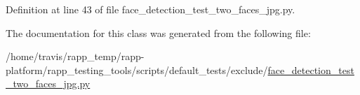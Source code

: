Definition at line 43 of file face\-\_\-detection\-\_\-test\-\_\-two\-\_\-faces\-\_\-jpg.\-py.



The documentation for this class was generated from the following file\-:\begin{DoxyCompactItemize}
\item 
/home/travis/rapp\-\_\-temp/rapp-\/platform/rapp\-\_\-testing\-\_\-tools/scripts/default\-\_\-tests/exclude/\hyperlink{face__detection__test__two__faces__jpg_8py}{face\-\_\-detection\-\_\-test\-\_\-two\-\_\-faces\-\_\-jpg.\-py}\end{DoxyCompactItemize}
